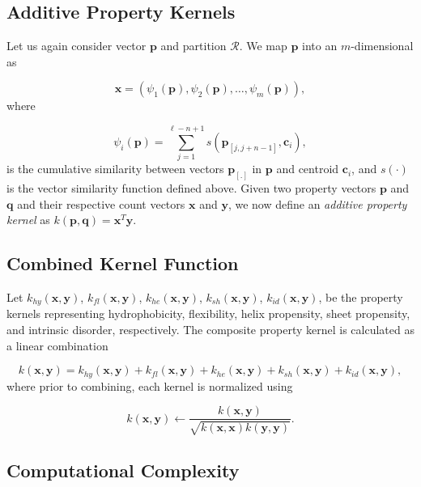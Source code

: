 \subsection{Additive Property Kernels}
\label{sec:additivekernels}

Let us again consider vector $\mathbf{p}$ and partition $\mathcal{R}$. We map $\mathbf{p}$ into an $m$-dimensional as 

\[
\mathbf{x}=\left(\psi_{1}(\mathbf{p}),\psi_{2}(\mathbf{p}),\ldots,\psi_{m}(\mathbf{p})\right),
\]
where 

\[
\psi_{i}(\mathbf{p})=\sum_{j=1}^{\ell-n+1}s\left(\mathbf{p}_{\left[j,j+n-1\right]},\mathbf{c}_{i}\right),
\]
is the cumulative similarity between vectors $\mathbf{p}_{[.]}$ in $\mathbf{p}$ and centroid $\mathbf{c}_{i}$, and $s\left(\cdot\right)$ is the vector similarity function defined above. Given two property vectors $\mathbf{p}$ and $\mathbf{q}$ and their respective count vectors $\mathbf{x}$ and $\mathbf{y}$, we now define an \textit{additive property kernel} as $k(\mathbf{p},\mathbf{q})=\mathbf{x}^{T}\mathbf{y}$. 


\subsection{Combined Kernel Function}
\label{sec:combinedkernels}

Let $k_{hy}(\mathbf{x},\mathbf{y})$, $k_{fl}(\mathbf{x},\mathbf{y})$, $k_{he}(\mathbf{x},\mathbf{y})$, $k_{sh}(\mathbf{x},\mathbf{y})$, $k_{id}(\mathbf{x},\mathbf{y})$, be the property kernels representing hydrophobicity, flexibility, helix propensity, sheet propensity, and intrinsic disorder, respectively. The composite property kernel is calculated as a linear combination

\[
k(\mathbf{x},\mathbf{y})=k_{hy}(\mathbf{x},\mathbf{y})+k_{fl}(\mathbf{x},\mathbf{y})+k_{he}(\mathbf{x},\mathbf{y})+k_{sh}(\mathbf{x},\mathbf{y})+k_{id}(\mathbf{x},\mathbf{y}),
\]
where prior to combining, each kernel is normalized using

\[
k(\mathbf{x},\mathbf{y})\leftarrow\frac{k(\mathbf{x},\mathbf{y})}{\sqrt{k(\mathbf{x},\mathbf{x})k(\mathbf{y},\mathbf{y})}}.
\]



\subsection{Computational Complexity}

